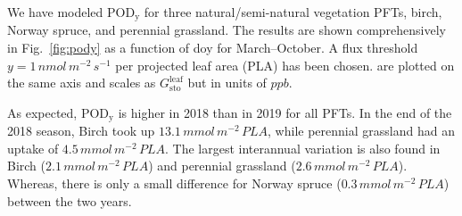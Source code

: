 \documentclass[bg, manuscript]{copernicus}
\begin{document}
We have modeled $\mathrm{POD_y}$ for three natural/semi-natural vegetation PFTs, birch, Norway spruce, and perennial grassland. The results are shown comprehensively in Fig.~\ref{fig:pody} as a function of doy for March--October. A flux threshold $y=1\,\unit{nmol\,m^{-2}\,s^{-1}}$ per projected leaf area (PLA) has been chosen. \chem{[O_3]} are plotted on the same axis and scales as $G_\text{sto}^\text{leaf}$ but in units of $\unit{ppb}$.

As expected, $\mathrm{POD_y}$ is higher in 2018 than in 2019 for all PFTs. In the end of the 2018 season, Birch took up $13.1\,\unit{mmol\,m^{-2}\,PLA}$, while perennial grassland had an uptake of $4.5\,\unit{mmol\,m^{-2}\,PLA}$. The largest interannual variation is also found in Birch ($2.1\,\unit{mmol\,m^{-2}\,PLA}$) and perennial grassland ($2.6\,\unit{mmol\,m^{-2}\,PLA}$). Whereas, there is only a small difference for Norway spruce ($0.3\,\unit{mmol\,m^{-2}\,PLA}$) between the two years.


\end{document}
